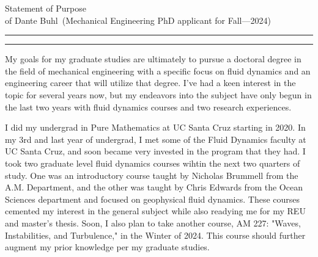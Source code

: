 \documentclass{article}
\newcommand{\soptitle}{Statement of Purpose}
\newcommand{\yourname}{Dante Buhl}
\begin{document}
\begin{center}\LARGE\soptitle\\
\large of \yourname\ (Mechanical Engineering PhD applicant for Fall---2024)
\end{center}

\hrule
\vspace{1pt}
\hrule height 1pt

\bigskip

\large
My goals for my graduate studies are ultimately to pursue a doctoral degree in the field of mechanical engineering with a specific focus on fluid dynamics and an engineering career that will utilize that degree. I've had a keen interest in the topic for several years now, but my endeavors into the subject have only begun in the last two years with fluid dynamics courses and two research experiences. 

I did my undergrad in Pure Mathematics at UC Santa Cruz starting in 2020. In my 3rd and last year of undergrad, I met some of the Fluid Dynamics faculty at UC Santa Cruz, and soon became very invested in the program that they had. I took two graduate level fluid dynamics courses wihtin the next two quarters of study. One was an introductory course taught by Nicholas Brummell from the A.M. Department, and the other was taught by Chris Edwards from the Ocean Sciences department and focused on geophysical fluid dynamics. These courses cemented my interest in the general subject while also readying me for my REU and master's thesis. Soon, I also plan to take another course, AM 227: "Waves, Instabilities, and Turbulence," in the Winter of 2024. This course should further augment my prior knowledge per my graduate studies. 
\end{document}

